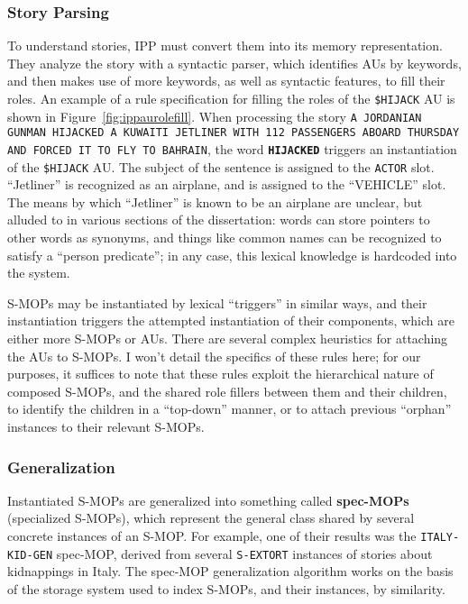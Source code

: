 \subsubsection{Story Parsing}
To understand stories, IPP must convert them into its memory representation. They analyze the story with a syntactic parser, which identifies AUs by keywords, and then makes use of more keywords, as well as syntactic features, to fill their roles. An example of a rule specification for filling the roles of the \texttt{\$HIJACK} AU is shown in Figure~\vref{fig:ippaurolefill}. When processing the story \texttt{A JORDANIAN GUNMAN HIJACKED A KUWAITI JETLINER WITH
112 PASSENGERS ABOARD THURSDAY AND FORCED IT TO FLY TO
BAHRAIN}, the word \texttt{\textbf{HIJACKED}} triggers an instantiation of the \texttt{\$HIJACK} AU. The subject of the sentence is assigned to the \texttt{ACTOR} slot. ``Jetliner'' is recognized as an airplane, and is assigned to the ``VEHICLE'' slot. The means by which ``Jetliner'' is known to be an airplane are unclear, but alluded to in various sections of the dissertation: words can store pointers to other words as synonyms, and things like common names can be recognized to satisfy a ``person predicate''; in any case, this lexical knowledge is hardcoded into the system.

S-MOPs may be instantiated by lexical ``triggers'' in similar ways, and their instantiation triggers the attempted instantiation of their components, which are either more S-MOPs or AUs. There are several complex heuristics for attaching the AUs to S-MOPs. I won't detail the specifics of these rules here; for our purposes, it suffices to note that these rules exploit the hierarchical nature of composed S-MOPs, and the shared role fillers between them and their children, to identify the children in a ``top-down'' manner, or to attach previous ``orphan'' instances to their relevant S-MOPs.

\subsubsection{Generalization}
Instantiated S-MOPs are generalized into something called \textbf{spec-MOPs} (specialized S-MOPs), which represent the general class shared by several concrete instances of an S-MOP. For example, one of their results was the \texttt{ITALY-KID-GEN} spec-MOP, derived from several \texttt{S-EXTORT} instances of stories about kidnappings in Italy. The spec-MOP generalization algorithm works on the basis of the storage system used to index S-MOPs, and their instances, by similarity.

